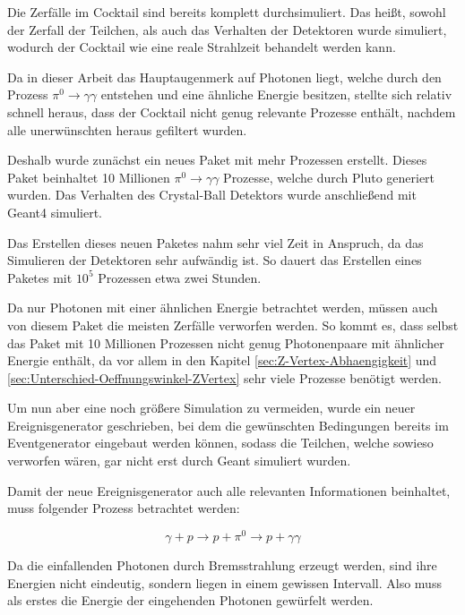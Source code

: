 \documentclass[a4paper,11pt,oneside,final,german,openbib,pdftex]{scrbook}
\begin{document}
{Die Zerf\"alle im Cocktail sind bereits komplett durchsimuliert. Das hei{\ss}t, sowohl der Zerfall der Teilchen, als auch das Verhalten der Detektoren wurde simuliert, wodurch der Cocktail wie eine reale Strahlzeit behandelt werden kann.

Da in dieser Arbeit das Hauptaugenmerk auf Photonen liegt, welche durch den Prozess $\pi^0 \rightarrow \gamma \gamma$ entstehen und eine \"ahnliche Energie besitzen, stellte sich relativ schnell heraus, dass der Cocktail nicht genug relevante Prozesse enth\"alt, nachdem alle unerw\"unschten heraus gefiltert wurden. 

Deshalb wurde zun\"achst ein neues Paket mit mehr Prozessen erstellt. 
Dieses Paket beinhaltet 10 Millionen $\pi^0 \rightarrow \gamma \gamma$ Prozesse, welche durch Pluto generiert wurden. Das Verhalten des Crystal-Ball Detektors wurde anschlie{\ss}end mit Geant4 simuliert.

Das Erstellen dieses neuen Paketes nahm sehr viel Zeit in Anspruch, da das Simulieren der Detektoren sehr aufw\"andig ist. So dauert das Erstellen eines Paketes mit $10^5$ Prozessen etwa zwei Stunden. 

Da nur Photonen mit einer \"ahnlichen Energie betrachtet werden, m\"ussen auch von diesem Paket die meisten Zerf\"alle verworfen werden. So kommt es, dass selbst das Paket mit 10 Millionen Prozessen nicht genug Photonenpaare mit \"ahnlicher Energie enth\"alt, da vor allem in den Kapitel \ref{sec:Z-Vertex-Abhaengigkeit} und \ref{sec:Unterschied-Oeffnungswinkel-ZVertex} sehr viele Prozesse ben\"otigt werden.

Um nun aber eine noch größere Simulation zu vermeiden, wurde ein neuer Ereignisgenerator geschrieben, bei dem die gew\"unschten Bedingungen bereits im Eventgenerator eingebaut werden k\"onnen, sodass die Teilchen, welche sowieso verworfen w\"aren, gar nicht erst durch Geant simuliert wurden. 

Damit der neue Ereignisgenerator auch alle relevanten Informationen beinhaltet, muss folgender Prozess betrachtet werden:

\begin{equation}
\gamma + p \rightarrow p + \pi^0 \rightarrow p + \gamma \gamma 
\end{equation}

Da die einfallenden Photonen durch Bremsstrahlung erzeugt werden, sind ihre Energien nicht eindeutig, sondern liegen in einem gewissen Intervall. Also muss als erstes die Energie der eingehenden Photonen gew\"urfelt werden.

}
\end{document}
